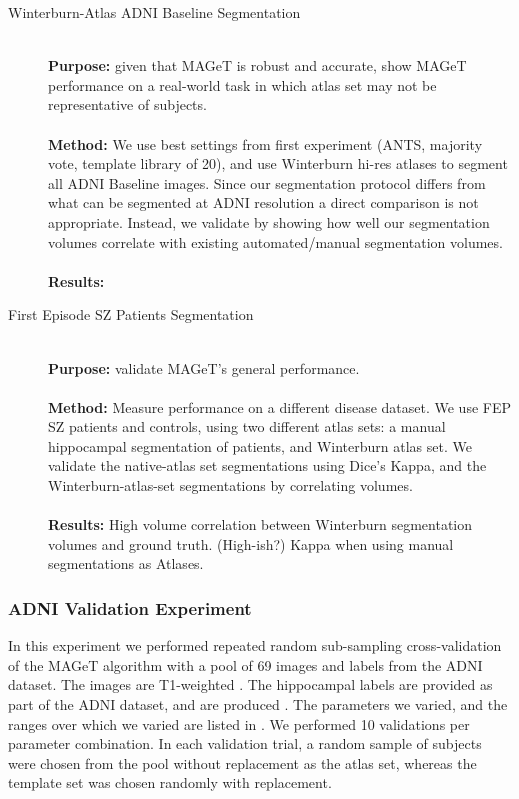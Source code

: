 \documentclass{article}\usepackage{graphicx, color}
\makeatletter
\newenvironment{kframe}{%
 \def\at@end@of@kframe{}%
 \ifinner\ifhmode%
  \def\at@end@of@kframe{\end{minipage}}%
  \begin{minipage}{\columnwidth}%
 \fi\fi%
 \def\FrameCommand##1{\hskip\@totalleftmargin \hskip-\fboxsep
 \colorbox{shadecolor}{##1}\hskip-\fboxsep
     \hskip-\linewidth \hskip-\@totalleftmargin \hskip\columnwidth}%
 \MakeFramed {\advance\hsize-\width
   \@totalleftmargin\z@ \linewidth\hsize
   \@setminipage}}%
 {\par\unskip\endMakeFramed%
 \at@end@of@kframe}
\newcommand{\marginnote}[1]{\-\marginpar[\raggedleft\footnotesize #1]{\raggedright\footnotesize #1}}
\newcommand{\todo}[1]{\marginnote{\textcolor{red}{TODO #1}}}
\makeatother
\begin{document}
\begin{kframe}
\begin{description}
\item[Winterburn-Atlas ADNI Baseline Segmentation] \hfill \\
{\bf Purpose:} given that MAGeT is robust and accurate, show MAGeT performance on a real-world task in which atlas set may not be representative of subjects.
\\ \\
{\bf Method:} We use best settings from first experiment (ANTS, majority vote, 
template library of 20), and use Winterburn hi-res atlases to segment all ADNI Baseline 
images.  Since our segmentation protocol differs from what can be segmented at 
ADNI resolution a direct comparison is not appropriate.  Instead, we validate by 
showing how well our segmentation volumes correlate with existing automated/manual 
segmentation volumes. \todo{Also show disease prediction?}
\\ \\
{\bf Results: } 

\item[First Episode SZ Patients Segmentation] \hfill \\ 
{\bf Purpose:} validate MAGeT's general performance.
\\ \\
{\bf Method:} Measure performance on a different disease dataset. We use FEP SZ patients and controls, 
using two different atlas sets: a manual hippocampal segmentation of patients, and Winterburn 
atlas set.  We validate the native-atlas set segmentations using Dice's Kappa, 
and the Winterburn-atlas-set segmentations by correlating volumes. 
\\ \\
{\bf Results:} High volume correlation between Winterburn segmentation volumes and ground truth.  (High-ish?) Kappa when using manual segmentations as Atlases. 

\end{description}
\end{kframe}

\subsubsection{ADNI Validation Experiment}

In this experiment we performed repeated random sub-sampling cross-validation
of the MAGeT algorithm with a pool of 69 images and labels from the ADNI
dataset.  The images are T1-weighted \todo{<insert description of scan/machine
types>}.  The hippocampal labels are provided as part of the ADNI dataset, and
are produced \todo{<insert description of SNT labellings>}.  The parameters we
varied, and the ranges over which we varied are listed in \todo{table}.  We
performed 10 validations per parameter combination.  In each validation trial,
a random sample of subjects were chosen from the pool without replacement as
the atlas set, whereas the template set was chosen randomly with replacement.   
\end{document}
